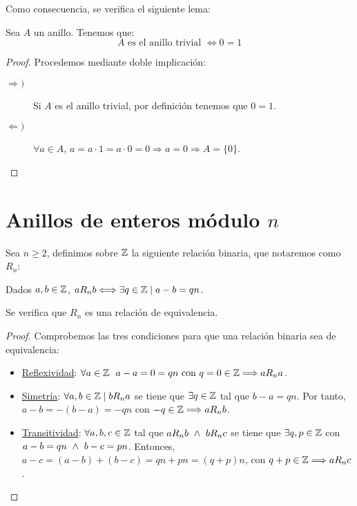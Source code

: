Como consecuencia, se verifica el siguiente lema:
\begin{lema}
    Sea $A$ un anillo. Tenemos que:
    \begin{equation*}
        A \text{ es el anillo trivial } \Longleftrightarrow 0=1
    \end{equation*}
\end{lema}
\begin{proof}
    Procedemos mediante doble implicación:
    \begin{description}
        \item[$\Longrightarrow)$] Si $A$ es el anillo trivial, por definición tenemos que $0=1$.
        \item[$\Longleftarrow)$] $\forall a \in A$, $a = a\cdot 1 = a\cdot 0 = 0 \Longrightarrow a = 0 \Longrightarrow A = \{0\}$.
    \end{description}
\end{proof}


\section{Anillos de enteros módulo $n$}
\begin{definicion}
    Sea $n \geq 2$, definimos sobre $\mathbb Z$ la siguiente relación binaria, que notaremos como $R_n$:
    
    Dados $a,b \in  \mathbb Z$, $aR_nb \Longleftrightarrow \exists q \in \mathbb Z \mid a-b = qn$.
\end{definicion}

\begin{lema}
    Se verifica que $R_n$ es una relación de equivalencia.
\end{lema}
\begin{proof} Comprobemos las tres condiciones para que una relación binaria sea de equivalencia:
\begin{itemize}
    \item \underline{Reflexividad}: $\forall a \in \mathbb Z~~a-a = 0 = qn \mbox{ con } q = 0 \in \mathbb Z \Longrightarrow aR_na$.
    \item \underline{Simetría}: $\forall a,b \in \mathbb Z \mid bR_na$ se tiene que $\exists q \in \mathbb Z$ tal que $b-a = qn$. Por tanto, $a-b = -(b-a)=-qn$ con $-q \in \mathbb Z \Longrightarrow aR_nb$.
    \item \underline{Transitividad}: $\forall a,b,c \in \mathbb Z$ tal que $aR_nb \ \land \  bR_nc$ se tiene que $\exists q,p \in \mathbb Z $ con $ a-b = qn \ \land \  b-c = pn$. Entonces, $a-c = (a-b)+(b-c) = qn + pn = (q+p)n$, con $q+p\in \mathbb Z \Longrightarrow aR_nc$.
\end{itemize}
\end{proof}

